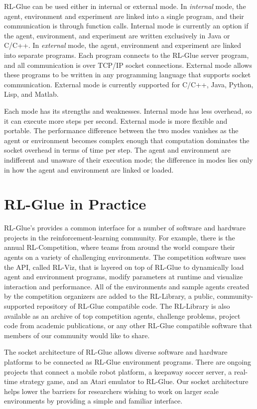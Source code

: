 \documentclass[twoside,11pt]{article}
\begin{document}
 RL-Glue can be used either in  internal or external mode.  In \textit{internal} mode, the agent, environment and experiment are linked into a single program, and their communication is through function calls.  Internal mode is currently an option if the agent, environment, and experiment are written exclusively in Java or C/C++.  In  \textit{external} mode, the agent, environment and experiment are linked into separate programs.  Each program connects to the RL-Glue server program, and all communication is over TCP/IP socket connections. External mode allows these programs to be written in any programming language that supports socket communication.  External mode is currently supported for C/C++, Java, Python, Lisp, and Matlab.

Each mode has its strengths and weaknesses. Internal mode has less overhead, so it can execute more steps per second. External mode is more flexible and portable.  The performance difference between the two modes vanishes as the agent or environment becomes complex enough that computation dominates the socket overhead in terms of time per step.  The agent and environment are indifferent and unaware of their execution mode; the difference in modes lies only in how the agent and environment are linked or loaded.

\section{RL-Glue in Practice}
RL-Glue's provides a common interface for a number of software and hardware projects in the reinforcement-learning community. For example, there is the annual RL-Competition, where teams from around the world compare their agents on a variety of challenging environments.  The competition software uses the API, called RL-Viz, that is layered on top of RL-Glue to dynamically load agent and environment programs, modify parameters at runtime and visualize interaction and performance.  All of the environments and sample agents created by the competition organizers are added to the RL-Library, a public, community-supported repository of RL-Glue compatible code. The RL-Library is also available as an archive of top competition agents, challenge problems, project code from academic publications, or any other RL-Glue compatible software that members of our community would like to share.


The socket architecture of RL-Glue allows diverse software and hardware platforms to be connected as RL-Glue environment programs.  There are ongoing projects that connect a mobile robot platform, a keepaway soccer server, a real-time strategy game, and an Atari emulator to RL-Glue. Our socket architecture helps lower the barriers for researchers wishing to work on larger scale environments by providing a simple and familiar interface. %
\end{document}
